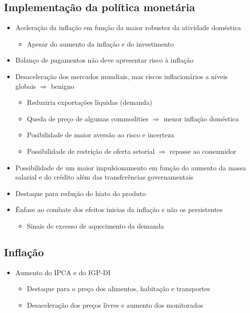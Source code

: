 \documentclass[11pt]{article}
\begin{document}
\subsection*{Implementação da política monetária}
\label{sec:orgbf06b70}
\begin{itemize}
\item Aceleração da inflação em função da maior robustez da atividade doméstica
\begin{itemize}
\item Apesar do aumento da inflação e do investimento
\end{itemize}
\item Balanço de pagamentos não deve apresentar risco à inflação
\item Desaceleração dos mercados mundiais, mas riscos inflacionários a níveis globais \(\Rightarrow\) benigno
\begin{itemize}
\item Reduziria exportações líquidas (demanda)
\item Queda de preço de algumas commodities \(\Rightarrow\) menor inflação doméstica
\item Posibilidade de maior aversão ao risco e incerteza
\item Possibilidade de restrição de oferta setorial \(\Rightarrow\) repasse ao consumidor
\end{itemize}
\item Possibilidade de um maior impulsionamento em função do aumento da massa salarial e do crédito além das transferências governamentais
\item Destaque para redução do hiato do produto
\item Ênfase ao combate dos efeitos inicias da inflação e não os persistentes
\begin{itemize}
\item Sinais de excesso de aquecimento da demanda
\end{itemize}
\end{itemize}
\subsection*{Inflação}
\label{sec:orgd880a19}
\begin{itemize}
\item Aumento do IPCA e do IGP-DI
\begin{itemize}
\item Destaque para o preço dos alimentos, habitação e transportes
\item Desaceleração dos preços livres e aumento dos monitorados
\end{itemize}
\end{itemize}
\end{document}
